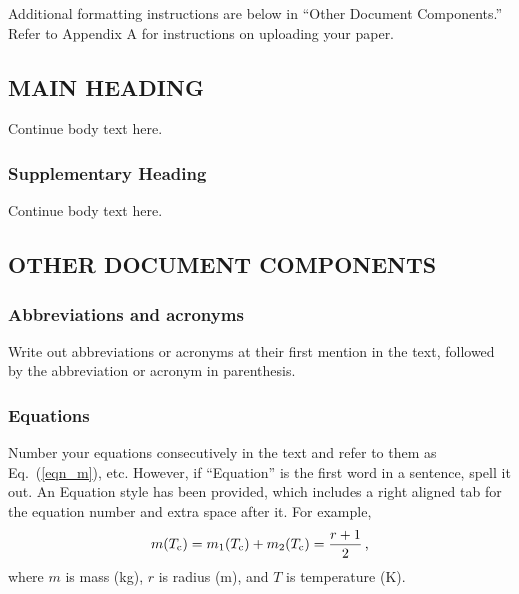 \documentclass[fleqn,b5paper,10pt]{article}
\begin{document}
Additional formatting instructions are below in ``Other Document Components.'' Refer to Appendix A for instructions on uploading your paper.

\vspace*{-.67in} %

\subsection*{MAIN HEADING}

Continue body text here.

\subsubsection*{Supplementary Heading}

Continue body text here.

\subsection*{OTHER DOCUMENT COMPONENTS}

\subsubsection*{Abbreviations and acronyms}

Write out abbreviations or acronyms at their first mention in the text, followed by the abbreviation or acronym in parenthesis.

\subsubsection*{Equations}

Number your equations consecutively in the text and refer to them as Eq.~(\ref{eqn_m}), etc. However, if ``Equation'' is the first word in a sentence, spell it out. An Equation style has been provided, which includes a right aligned tab for the equation number and extra space after it. For example,
\begin{equation}
\label{eqn_m}
m(T_{\rm c}) = m_1(T_{\rm c}) + m_2(T_{\rm c}) = \frac{r+1}{2} \,\mbox{,}
\end{equation}
where $m$ is mass (kg), $r$ is radius (m), and $T$ is temperature (K).
\end{document}
